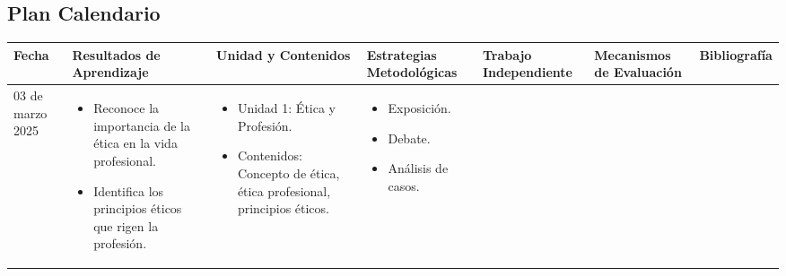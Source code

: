 \begin{landscape}
    \section{Plan Calendario}

    \begin{adjustbox}{width=1.3847\textwidth}
        \begin{tabular}{ | p{3cm} | p{5cm} | p{5cm} | p{3cm} | p{3cm} | p{3cm} | p{5cm} | }
            \hline
            \textbf{Fecha} & \textbf{Resultados de Aprendizaje} & \textbf{Unidad y Contenidos} & \textbf{Estrategias Metodológicas} & \textbf{Trabajo Independiente} & \textbf{Mecanismos de Evaluación} & \textbf{Bibliografía} \\
            \hline
            03 de marzo 2025 & \begin{minipage}
                [t]{5cm}
                \begin{itemize}[leftmargin=10pt]
                    \item Reconoce la importancia de la ética en la vida profesional.
                    \item Identifica los principios éticos que rigen la profesión.
                \end{itemize}
            \end{minipage} & \begin{minipage}
                [t]{5cm}
                \begin{itemize}[leftmargin=10pt]
                    \item Unidad 1: Ética y Profesión.
                    \item Contenidos: Concepto de ética, ética profesional, principios éticos.
                \end{itemize}
                \end{minipage} & \begin{minipage}
                    [t]{3cm}
                \begin{itemize}[leftmargin=10pt]
                    \item Exposición.
                    \item Debate.
                    \item Análisis de casos.
                \end{itemize}
                \end{minipage} & \begin{minipage}
                    [t]{3cm}

\end{minipage}
\end{tabular}
\end{adjustbox}
\end{landscape}
